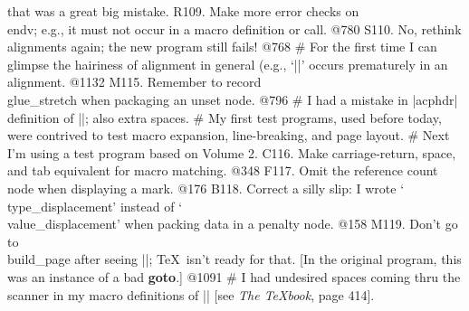 {	that was a great big mistake.
R109. Make more error checks on \\{endv}; e.g., it must not occur in
	a macro definition or call. @780
S110. No, rethink alignments again; the new program still fails! @768
# For the first time I can glimpse the
	hairiness of alignment in general (e.g., `||' occurs prematurely in an alignment. @1132
M115. Remember to record \\{glue_stretch} when packaging an unset node. @796
# I had a mistake in |acphdr| definition of\/ |\quoteformat|; also extra spaces.
# My first test programs, used before today, were contrived to test macro
	expansion, line-breaking, and page layout.
# Next I'm using a test program based on Volume 2.
C116. Make carriage-return, space, and tab equivalent for macro matching. @348
F117. Omit the reference count node when displaying a mark. @176
B118. Correct a silly slip: I wrote `\\{type_displacement}' instead of
	`\\{value_displacement}' when packing data in a penalty node. @158
M119. Don't go to \\{build_page} after seeing |\noindent|; \TeX\ isn't
	ready for that.
	[In the original program, this was an instance of a bad {\bf goto}.] @1091
# I had undesired spaces coming thru the scanner in my macro definitions
	of\/ |\tenpoint| [see {\sl The \TeX book}, page 414].
}
